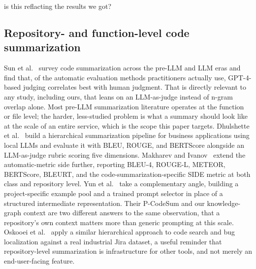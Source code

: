 is this reflacting the results we got?\documentclass[conference]{IEEEtran}
\begin{document}
\subsection{Repository- and function-level code summarization}
Sun et al.~\cite{sun2024source} survey code summarization across the pre-LLM and LLM eras and
find that, of the automatic evaluation methods practitioners actually use, GPT-4-based judging
correlates best with human judgment. That is directly relevant to any study, including ours,
that leans on an LLM-as-judge instead of n-gram overlap alone. Most pre-LLM summarization
literature operates at the function or file level; the harder, less-studied problem is what a
summary should look like at the scale of an entire service, which is the scope this paper
targets. Dhulshette et al.~\cite{dhulshette2025hierarchical} build a hierarchical summarization
pipeline for business applications using local LLMs and evaluate it with BLEU, ROUGE, and
BERTScore alongside an LLM-as-judge rubric scoring five dimensions. Makharev and
Ivanov~\cite{makharev2025beyond} extend the automatic-metric side further, reporting BLEU-4,
ROUGE-L, METEOR, BERTScore, BLEURT, and the code-summarization-specific SIDE metric at both
class and repository level. Yun et al.~\cite{yun2024projectspecific} take a complementary angle,
building a project-specific example pool and a trained prompt selector in place of a structured
intermediate representation. Their P-CodeSum and our knowledge-graph context are two different
answers to the same observation, that a repository's own context matters more than generic
prompting at this scale. Oskooei et al.~\cite{oskooei2025repositorylevel} apply a similar
hierarchical approach to code search and bug localization against a real industrial Jira
dataset, a useful reminder that repository-level summarization is infrastructure for other
tools, and not merely an end-user-facing feature.
\end{document}
